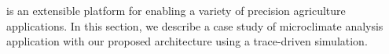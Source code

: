 \myname{} is an extensible platform for enabling a variety of precision agriculture applications. In this section, we describe a case study of microclimate analysis application with our proposed architecture using a trace-driven simulation. 

    
     
    

